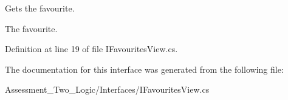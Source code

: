 Gets the favourite. 

The favourite.

Definition at line 19 of file IFavouritesView.cs.



The documentation for this interface was generated from the following file:\begin{DoxyCompactItemize}
\item 
Assessment\_\-Two\_\-Logic/Interfaces/IFavouritesView.cs\end{DoxyCompactItemize}
